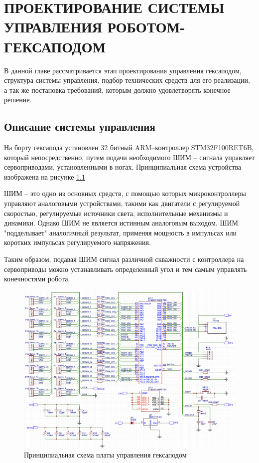 \chapter{ПРОЕКТИРОВАНИЕ СИСТЕМЫ УПРАВЛЕНИЯ РОБОТОМ-ГЕКСАПОДОМ}

В данной главе рассматривается этап проектирования управления гексаподом, структура системы управления, подбор технических средств для его реализации, а так же постановка требований, которым должно удовлетворять конечное решение.

\section{Описание системы управления}

На борту гексапода установлен 32 битный ARM–контроллер STM32F100RET6B, который непосредственно, путем подачи необходимого ШИМ – сигнала управляет сервоприводами, установленными в ногах. Принципиальная схема устройства изображена на рисунке \ref{img:principial}

ШИМ – это одно из основных средств, с помощью которых микроконтроллеры управляют аналоговыми устройствами, такими как двигатели с регулируемой скоростью, регулируемые источники света, исполнительные механизмы и динамики. Однако ШИМ не является истинным аналоговым выходом. ШИМ "подделывает" аналогичный результат, применяя мощность в импульсах или коротких импульсах регулируемого напряжения.

Таким образом, подавая ШИМ сигнал различной скважности с контроллера на сервоприводы можно устанавливать определенный угол и тем самым управлять конечностями робота.

\begin{figure}
	\centering
	\includegraphics[width = \linewidth]{img/principial}
	\caption{Принципиальная схема платы управления гексаподом}
	\label{img:principial}
\end{figure}

